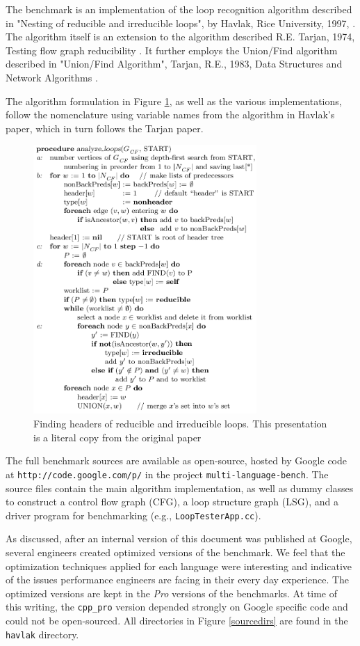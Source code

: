 The benchmark is an implementation of the loop recognition algorithm
described in "Nesting of reducible and irreducible loops", by Havlak,
Rice University, 1997, \cite{havlak}.  The algorithm itself is an
extension to the algorithm described R.E. Tarjan, 1974, Testing flow
graph reducibility \cite{Tarjan:1983}. 
It further employs the Union/Find algorithm
described in "Union/Find Algorithm", Tarjan, R.E., 1983, Data
Structures and Network Algorithms \cite{Tarjan:1973}.

The algorithm formulation in Figure \ref{algofig}, as well as the
various implementations, follow the nomenclature using variable names
from the algorithm in Havlak's paper, which in turn follows the Tarjan
paper.

\begin{figure}
\includegraphics[width=85mm]{havlaklarge.png}
\caption{Finding headers of reducible and irreducible loops. This 
    presentation is a literal copy from the original paper \cite{havlak}}
\label{algofig}
\end{figure}

The full benchmark sources are available as open-source, hosted
by Google code at {\tt http://code.google.com/p/} in the project
{\tt multi-language-bench}.
The source files contain the main algorithm
implementation, as well as dummy classes to
construct a control flow graph (CFG), a loop structure graph (LSG),
and a driver program for benchmarking (e.g., {\tt LoopTesterApp.cc}).

As discussed, after an internal version of this document was published
at Google, several engineers created optimized versions of the
benchmark. We feel that the optimization techniques applied for each
language were interesting and indicative of the issues
performance engineers are facing in their every day experience.  The
optimized versions are kept in the {\em Pro} versions of the
benchmarks. At time of this writing, the {\tt cpp\_pro} version
depended strongly on Google specific code and could not be open-sourced.
All directories in Figure \ref{sourcedirs} are found in the
{\tt havlak} directory.

